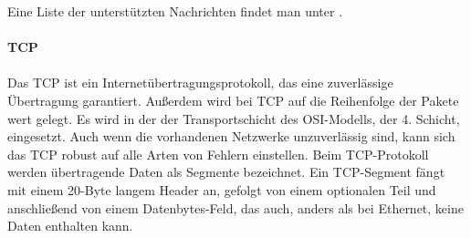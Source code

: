 Eine Liste der unterstützten Nachrichten findet man unter \cite{ICMP}.\\
\\
\textbf{TCP}
\\
\\
Das \gls{TCP} ist ein Internetübertragungsprotokoll, das eine zuverlässige Übertragung garantiert. Außerdem wird bei \gls{TCP} auf die Reihenfolge der Pakete wert gelegt. Es wird in der der Transportschicht des \gls{OSI-Modell}s, der 4. Schicht, eingesetzt. Auch wenn die vorhandenen Netzwerke unzuverlässig sind, kann sich das \gls{TCP} robust auf alle Arten von Fehlern einstellen. Beim \gls{TCP}-Protokoll werden übertragende Daten als Segmente bezeichnet. Ein \gls{TCP}-Segment fängt mit einem 20-Byte langem Header an, gefolgt von einem optionalen Teil und anschließend von einem Datenbytes-Feld, das auch, anders als bei Ethernet, keine Daten enthalten kann.
